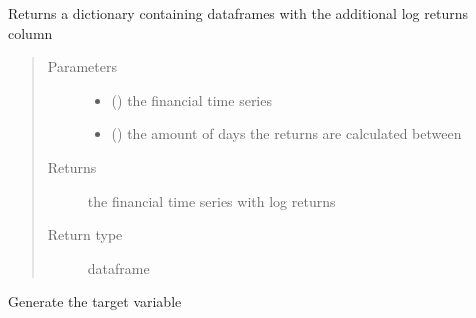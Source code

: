 \documentclass[letterpaper,10pt,english]{sphinxmanual}
\begin{document}
\begin{fulllineitems}
\label{\detokenize{index:Src.preprocessing.generate_lg_return}}
Returns a dictionary containing dataframes
with the additional log returns column
\begin{quote}\begin{description}
\item[{Parameters}] \leavevmode\begin{itemize}
\item {} 
 () \textendash{} the financial time series

\item {} 
 () \textendash{} the amount of days the returns are calculated between

\end{itemize}

\item[{Returns}] \leavevmode
the financial time series with log returns

\item[{Return type}] \leavevmode
dataframe

\end{description}\end{quote}

\end{fulllineitems}


\begin{fulllineitems}
\label{\detokenize{index:Src.preprocessing.generate_target}}
Generate the target variable

\end{fulllineitems}

\end{document}
